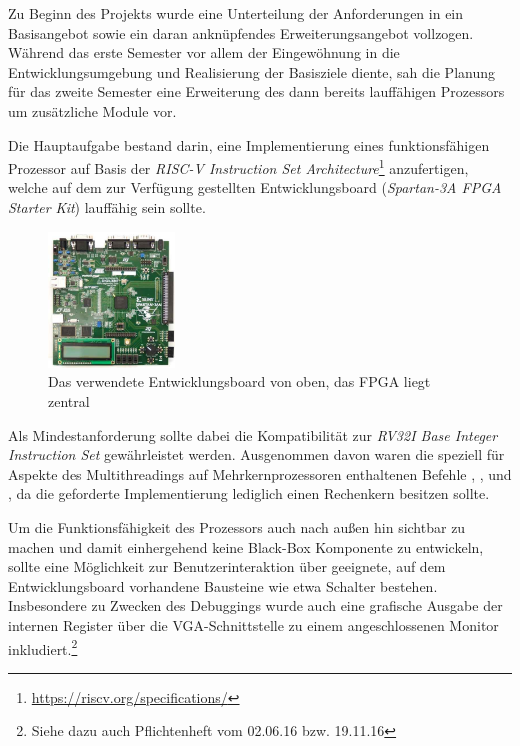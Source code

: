 Zu Beginn des Projekts wurde eine Unterteilung der Anforderungen in ein
Basisangebot sowie ein daran ankn\"upfendes Erweiterungsangebot vollzogen.
W\"ahrend das erste Semester vor allem der
Eingew\"ohnung in die Entwicklungsumgebung und Realisierung der Basisziele diente,
sah die Planung f\"ur das zweite Semester eine Erweiterung des dann bereits
lauff\"ahigen Prozessors um zus\"atzliche Module vor. 

Die Hauptaufgabe bestand darin, eine Implementierung eines funktionsf\"ahigen
Prozessor auf Basis der \textit{RISC-V Instruction Set Architecture}\footnote{\url{https://riscv.org/specifications/}}
anzufertigen, welche auf dem zur Verf\"ugung gestellten Entwicklungsboard
(\textit{Spartan-3A FPGA Starter Kit}) lauff\"ahig sein sollte.

\begin{figure}[H]
\centering
\label{fig:board}
\includegraphics[width=0.3\textwidth]{Board.png}
\caption{Das verwendete Entwicklungsboard von oben, das FPGA liegt zentral}
\end{figure}

Als Mindestanforderung sollte dabei die Kompatibilit\"at zur
\textit{RV32I Base Integer Instruction Set} gew\"ahrleistet werden. Ausgenommen
davon waren die speziell f\"ur Aspekte des Multithreadings auf
Mehrkernprozessoren enthaltenen Befehle , ,
 und , da die geforderte Implementierung lediglich
einen Rechenkern besitzen sollte.

Um die Funktionsf\"ahigkeit des Prozessors auch nach au\ss{}en hin sichtbar zu
machen und damit einhergehend keine Black-Box Komponente zu entwickeln, sollte
eine M\"oglichkeit zur Benutzerinteraktion \"uber geeignete, auf dem
Entwicklungsboard vorhandene Bausteine wie etwa Schalter bestehen. Insbesondere
zu Zwecken des Debuggings wurde auch eine grafische Ausgabe der internen
Register \"uber die VGA-Schnittstelle zu einem angeschlossenen Monitor
inkludiert.\footnote{Siehe dazu auch Pflichtenheft vom 02.06.16 bzw. 19.11.16}

